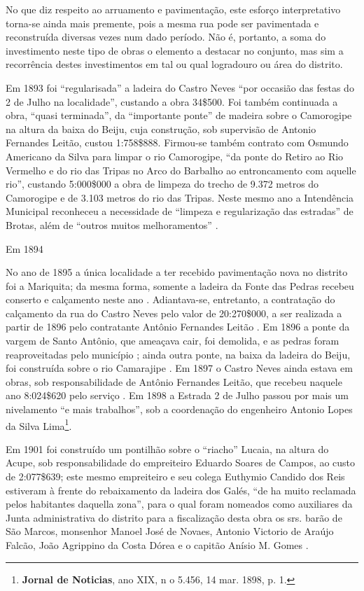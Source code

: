 No que diz respeito ao arruamento e pavimentação, este esforço interpretativo torna-se ainda mais premente, pois a mesma rua pode ser pavimentada e reconstruída diversas vezes num dado período. Não é, portanto, a soma do investimento neste tipo de obras o elemento a destacar no conjunto, mas sim a recorrência destes investimentos em tal ou qual logradouro ou área do distrito.

Em 1893 foi “regularisada” a ladeira do Castro Neves “por occasião das festas
do 2 de Julho na localidade”, custando a obra 34\$500. Foi também continuada a obra, “quasi terminada”, da “importante ponte” de madeira sobre o Camorogipe na altura da baixa do Beiju, cuja construção, sob supervisão de Antonio Fernandes Leitão, custou 1:758\$888. Firmou-se também contrato com Osmundo Americano da Silva para limpar o rio Camorogipe, “da ponte do Retiro ao Rio Vermelho e do rio das Tripas no Arco do Barbalho ao entroncamento com aquelle rio”, custando 5:000\$000 a obra de limpeza do trecho de 9.372 metros do Camorogipe e de 3.103 metros do rio das Tripas. Neste mesmo ano a Intendência Municipal reconheceu a necessidade de “limpeza e regularização das estradas” de Brotas, além de “outros muitos melhoramentos” \cite[pp.~47-48; anexo 3, pp.~18-19]{salvador_relatorio_1893}.

Em 1894

No ano de 1895 a única localidade a ter recebido pavimentação nova no distrito foi a Mariquita; da mesma forma, somente a ladeira da Fonte das
Pedras recebeu conserto e calçamento neste ano \cite[p.~16]{salvador_relatorio_1895}. Adiantava-se, entretanto, a contratação do calçamento da rua do Castro Neves pelo valor de 20:270\$000, a ser realizada a partir de 1896 pelo contratante Antônio Fernandes Leitão \cite[p.~23]{salvador_relatorio_1895}. Em 1896 a ponte da vargem de Santo Antônio, que ameaçava cair, foi demolida, e as pedras foram reaproveitadas pelo município \cite[p.~137]{salvador_relatorio_1895}; ainda outra ponte, na baixa da ladeira do Beiju, foi construída sobre o rio Camarajipe \cite[p.~156]{salvador_relatorio_1894}. Em 1897 o Castro Neves ainda estava em obras, sob responsabilidade de Antônio Fernandes Leitão, que recebeu naquele ano 8:024\$620 pelo serviço \cite[p.~99]{salvador_relatorio_1897}. Em 1898 a Estrada 2 de Julho passou por mais um nivelamento “e mais trabalhos”, sob a coordenação do engenheiro Antonio Lopes da Silva Lima\footnote{\textbf{Jornal de Noticias}, ano XIX, n o 5.456, 14 mar. 1898, p. 1.}.

Em 1901 foi construído um pontilhão sobre o “riacho” Lucaia, na altura do Acupe, sob responsabilidade do empreiteiro Eduardo Soares de Campos, ao custo de 2:077\$639; este mesmo empreiteiro e seu colega Euthymio Candido dos Reis estiveram à frente do rebaixamento da ladeira dos Galés, “de ha muito reclamada pelos habitantes daquella zona”, para o qual foram nomeados como auxiliares da Junta administrativa do distrito para a fiscalização desta obra os srs. barão de São Marcos, monsenhor Manoel José de Novaes, Antonio Victorio de Araújo Falcão, João Agrippino da Costa Dórea e o capitão Anísio M. Gomes \cite[pp.~15, 162, 249-250]{salvador_relatorio_1901}.

